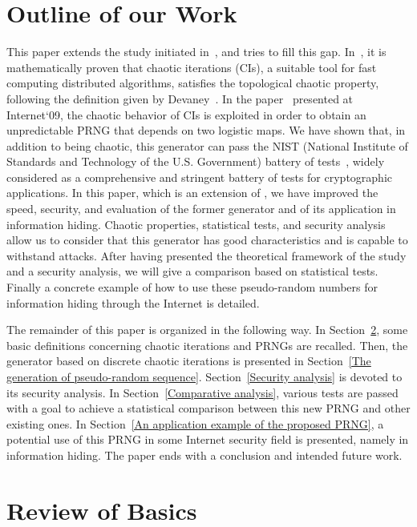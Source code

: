 \documentclass[journal]{IEEEtran}
\begin{document}
\section{Outline of our Work}

This paper extends the study initiated in~\cite{A2010,guyeux09,wang2009}, and tries to fill this gap. In~\cite{guyeux09}, it is mathematically proven that chaotic iterations (CIs), a suitable tool for fast computing distributed algorithms, satisfies the topological chaotic property, following the definition given by Devaney~\cite{Dev89}.
In the paper~\cite{wang2009} presented at Internet`09, the chaotic behavior of CIs is exploited in order to obtain an unpredictable PRNG that depends on two logistic maps.
We have shown that, in addition to being chaotic, this generator can pass the NIST (National Institute of Standards and Technology of the U.S. Government) battery of tests~\cite{ANDREW2008},
widely considered as a comprehensive and stringent battery of tests for cryptographic applications.
In this paper, which is an extension of \cite{A2010}, we have improved the speed, security, and evaluation of the former generator and of its application in information hiding.
Chaotic properties, statistical tests, and security analysis~\cite{ZHENG92008} allow us to consider that this generator has good characteristics and is capable to withstand attacks.
After having presented the theoretical framework of the study and a security analysis, we will give a comparison based on statistical tests. Finally a concrete example of how to use these pseudo-random numbers for information hiding through the Internet is detailed.


The remainder of this paper is organized in the following way. In Section~\ref{Basic recalls}, some basic definitions concerning chaotic iterations and PRNGs are recalled. Then, the generator based on discrete chaotic iterations is presented in Section~\ref{The generation of pseudo-random sequence}. Section~\ref{Security analysis} is devoted to its security analysis. In Section~\ref{Comparative analysis}, various tests are passed with a goal to achieve a statistical comparison between this new PRNG and other existing ones. In Section~\ref{An application example of the proposed PRNG}, a potential use of this PRNG in some Internet security field is presented, namely in information hiding. The paper ends with a conclusion and intended future work.


\section{Review of Basics}
\label{Basic recalls}
\end{document}
